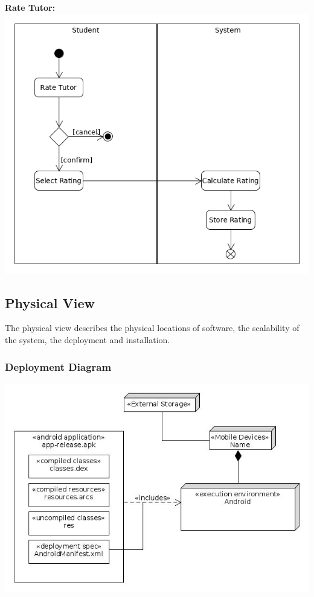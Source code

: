 \documentclass[12pt]{article}
\begin{document}
\\\\\textbf{Rate Tutor:}\\
\includegraphics[width=140mm]{./activity_diagram/rate_tutor.png}

\newpage

\subsection{Physical View}
The physical view describes the physical locations of software, the scalability of the system, the deployment and installation.
\subsubsection{Deployment Diagram}

\includegraphics[width=140mm]{./Deployment.jpg}
\end{document}
